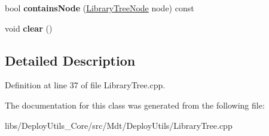 \begin{DoxyCompactItemize}
\item 
bool {\bfseries contains\+Node} (\hyperlink{class_mdt_1_1_deploy_utils_1_1_library_tree_node}{Library\+Tree\+Node} node) const \hypertarget{class_mdt_1_1_deploy_utils_1_1_library_tree_impl_a334de7509a069167edd4638668a98b2a}{}\label{class_mdt_1_1_deploy_utils_1_1_library_tree_impl_a334de7509a069167edd4638668a98b2a}

\item 
void {\bfseries clear} ()\hypertarget{class_mdt_1_1_deploy_utils_1_1_library_tree_impl_ada6ef65e9834fbbf5099ff77fe5d93e7}{}\label{class_mdt_1_1_deploy_utils_1_1_library_tree_impl_ada6ef65e9834fbbf5099ff77fe5d93e7}

\end{DoxyCompactItemize}


\subsection{Detailed Description}


Definition at line 37 of file Library\+Tree.\+cpp.



The documentation for this class was generated from the following file\+:\begin{DoxyCompactItemize}
\item 
libs/\+Deploy\+Utils\+\_\+\+Core/src/\+Mdt/\+Deploy\+Utils/Library\+Tree.\+cpp\end{DoxyCompactItemize}
